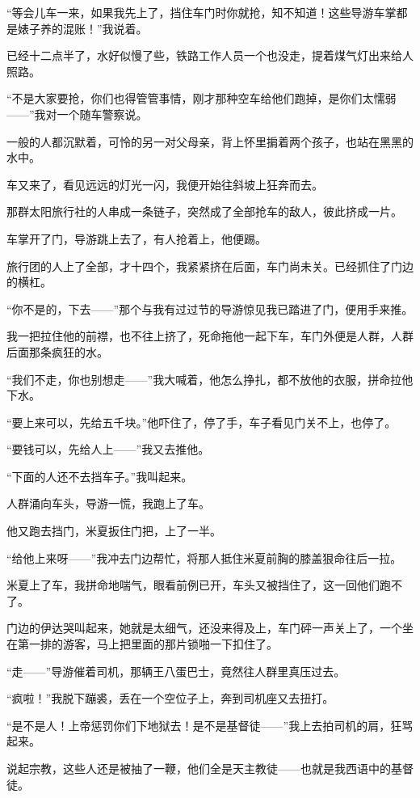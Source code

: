 \par “等会儿车一来，如果我先上了，挡住车门时你就抢，知不知道！这些导游车掌都是婊子养的混账！”我说着。
\par 已经十二点半了，水好似慢了些，铁路工作人员一个也没走，提着煤气灯出来给人照路。
\par “不是大家要抢，你们也得管管事情，刚才那种空车给他们跑掉，是你们太懦弱——”我对一个随车警察说。
\par 一般的人都沉默着，可怜的另一对父母亲，背上怀里掮着两个孩子，也站在黑黑的水中。
\par 车又来了，看见远远的灯光一闪，我便开始往斜坡上狂奔而去。
\par 那群太阳旅行社的人串成一条链子，突然成了全部抢车的敌人，彼此挤成一片。
\par 车掌开了门，导游跳上去了，有人抢着上，他便踢。
\par 旅行团的人上了全部，才十四个，我紧紧挤在后面，车门尚未关。已经抓住了门边的横杠。
\par “你不是的，下去——”那个与我有过过节的导游惊见我已踏进了门，便用手来推。
\par 我一把拉住他的前襟，也不往上挤了，死命拖他一起下车，车门外便是人群，人群后面那条疯狂的水。
\par “我们不走，你也别想走——”我大喊着，他怎么挣扎，都不放他的衣服，拼命拉他下水。
\par “要上来可以，先给五千块。”他吓住了，停了手，车子看见门关不上，也停了。
\par “要钱可以，先给人上——”我又去推他。
\par “下面的人还不去挡车子。”我叫起来。
\par 人群涌向车头，导游一慌，我跑上了车。
\par 他又跑去挡门，米夏扳住门把，上了一半。
\par “给他上来呀——”我冲去门边帮忙，将那人抵住米夏前胸的膝盖狠命往后一拉。
\par 米夏上了车，我拼命地喘气，眼看前例已开，车头又被挡住了，这一回他们跑不了。
\par 门边的伊达哭叫起来，她就是太细气，还没来得及上，车门砰一声关上了，一个坐在第一排的游客，马上把里面的那片锁啪一下扣住了。
\par “走——”导游催着司机，那辆王八蛋巴士，竟然往人群里真压过去。
\par “疯啦！”我脱下蹦裘，丢在一个空位子上，奔到司机座又去扭打。
\par “是不是人！上帝惩罚你们下地狱去！是不是基督徒——”我上去拍司机的肩，狂骂起来。
\par 说起宗教，这些人还是被抽了一鞭，他们全是天主教徒——也就是我西语中的基督徒。
